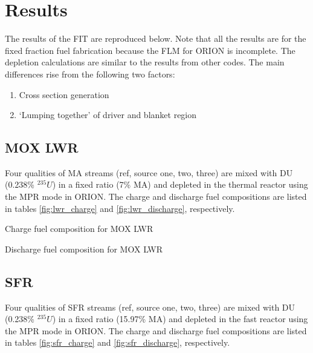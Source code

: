 \documentclass{article}
\begin{document}
\section{Results}
The results of the \gls{FIT} are reproduced below. Note that all the results are for the fixed fraction
fuel fabrication because the \gls{FLM} for ORION is incomplete. The depletion calculations are similar to the
results from other codes. The main differences rise from the following two factors:

\begin{enumerate}
    \item Cross section generation
    \item `Lumping together' of driver and blanket region
\end{enumerate}

\subsection{\gls{MOX} \gls{LWR}}
Four qualities of \gls{MA} streams (ref, source one, two, three) are mixed with 
\gls{DU} (0.238\% $^{235}U$) in a fixed ratio (7\% \gls{MA}) and depleted in the thermal reactor
using the MPR mode in ORION. The charge and discharge fuel compositions are listed in
tables \ref{fig:lwr_charge} and \ref{fig:lwr_discharge}, respectively.

\begin{table}[h]
    \centering
    
    \caption{Charge fuel composition for \gls{MOX} \gls{LWR}}
    \label{fig:lwr_charge}
\end{table}

\begin{table}[h]
    \centering
    
    \caption{Discharge fuel composition for \gls{MOX} \gls{LWR}}
    \label{fig:lwr_discharge}
\end{table}

\FloatBarrier

\subsection{\gls{SFR}}
Four qualities of \gls{SFR} streams (ref, source one, two, three) are mixed with
\gls{DU} (0.238\% $^{235}U$) in a fixed ratio (15.97\% \gls{MA}) and depleted in the 
fast reactor using the MPR mode in ORION. The charge and discharge fuel compositions are 
listed in tables \ref{fig:sfr_charge} and \ref{fig:sfr_discharge}, respectively.
\end{document}
